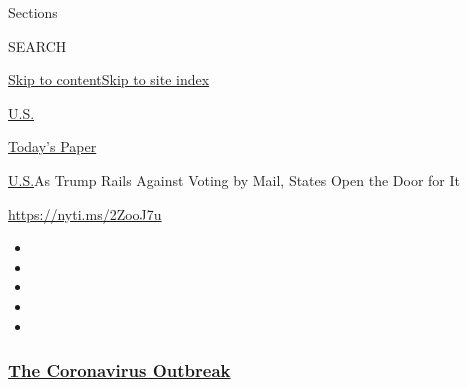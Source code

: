 Sections

SEARCH

\protect\hyperlink{site-content}{Skip to
content}\protect\hyperlink{site-index}{Skip to site index}

\href{https://www.nytimes3xbfgragh.onion/section/us}{U.S.}

\href{https://myaccount.nytimes3xbfgragh.onion/auth/login?response_type=cookie\&client_id=vi}{}

\href{https://www.nytimes3xbfgragh.onion/section/todayspaper}{Today's
Paper}

\href{/section/us}{U.S.}\textbar{}As Trump Rails Against Voting by Mail,
States Open the Door for It

\url{https://nyti.ms/2ZooJ7u}

\begin{itemize}
\item
\item
\item
\item
\item
\end{itemize}

\hypertarget{the-coronavirus-outbreak}{%
\subsubsection{\texorpdfstring{\href{https://www.nytimes3xbfgragh.onion/news-event/coronavirus?name=styln-coronavirus-national\&region=TOP_BANNER\&block=storyline_menu_recirc\&action=click\&pgtype=Article\&impression_id=a657b1b0-f4be-11ea-8528-3d6bd6e3ff1c\&variant=undefined}{The
Coronavirus
Outbreak}}{The Coronavirus Outbreak}}\label{the-coronavirus-outbreak}}

